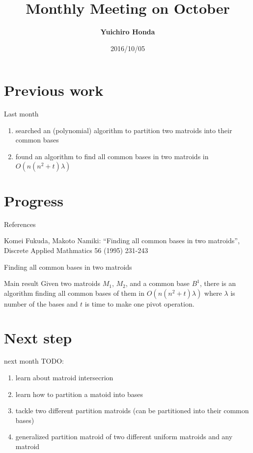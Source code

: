 \documentclass[11pt,xcolor=dvipsnames,table,dvipdfmx]{beamer}
\title{Monthly Meeting on October}
\author{\textbf{Yuichiro Honda}}
\date{2016/10/05}
\institute{Morita lab. M1}
\begin{document}
\maketitle

\section{Previous work}
\begin{frame}{Last month}
 \begin{enumerate}
  \item searched an (polynomial) algorithm to partition two matroids into their common bases
  \item found an algorithm to find all common bases in two matroids in $O(n(n^2+t)\lambda)$
 \end{enumerate}
\end{frame}



\section{Progress}
\begin{frame}{References}
 \begin{thebibliography}{9}
	\small{Komei Fukuda, Makoto Namiki: ``Finding all common bases in two matroids'', Discrete Applied Mathmatics 56 (1995) 231-243}
 \end{thebibliography}
\end{frame}

\begin{frame}{Finding all common bases in two matroids}
 \begin{block}{Main result}
  Given two matroids $M_1$, $M_2$, and a common base $B^1$, there is an algorithm finding all common bases of them in \alert{$O(n(n^2+t)\lambda)$ }where $\lambda$ is number of the bases and $t$ is time to make one pivot operation.
 \end{block}
\end{frame}


\section{Next step}
\begin{frame}{next month}
 TODO:
 \begin{enumerate}
  \item learn about matroid intersecrion
  \item learn how to partition a matoid into bases
  \item tackle two different partition matroids (can be partitioned into their common bases)
  \item generalized partition matroid of two different uniform matroids and any matroid
 \end{enumerate}
\end{frame}
\end{document}
